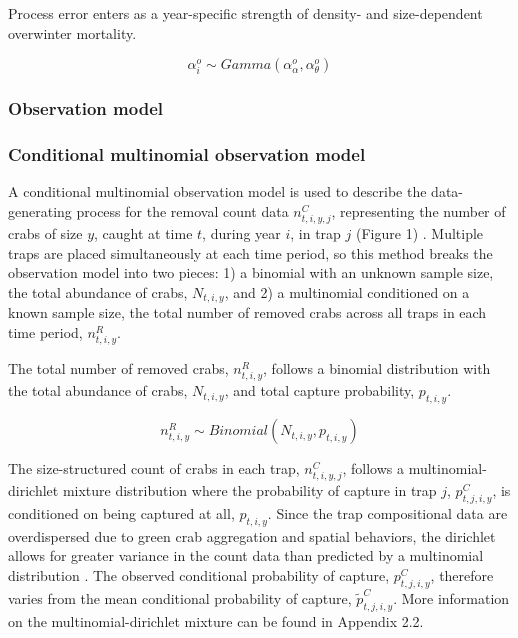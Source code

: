 \documentclass{article}
\begin{document}
Process error enters as a year-specific strength of density- and size-dependent overwinter mortality.

\begin{equation}
\alpha^o_i \sim Gamma(\alpha^o_{\alpha}, \alpha^o_{\theta})
\end{equation}

\subsubsection{Observation model}

\subsubsection*{Conditional multinomial observation model}

A conditional multinomial observation model is used to describe the data-generating process for the removal count data $n^C_{t,i,y,j}$, representing the number of crabs of size $y$, caught at time $t$, during year $i$, in trap $j$ (Figure 1) \parencite{kery2015modeling}. Multiple traps are placed simultaneously at each time period, so this method breaks the observation model into two pieces: 1) a binomial with an unknown sample size, the total abundance of crabs, $N_{t,i,y}$, and 2) a multinomial conditioned on a known sample size, the total number of removed crabs across all traps in each time period, $n^R_{t,i,y}$.

The total number of removed crabs, $n^R_{t,i,y}$, follows a binomial distribution with the total abundance of crabs, $N_{t,i,y}$, and total capture probability, $p_{t,i,y}$.

\begin{equation}
n^R_{t,i,y} \sim Binomial(N_{t,i,y}, p_{t,i,y})
\end{equation}

The size-structured count of crabs in each trap, $n^C_{t,i,y,j}$, follows a multinomial-dirichlet mixture distribution where the probability of capture in trap $j$, $p^C_{t,j,i,y}$, is conditioned on being captured at all, $p_{t,i,y}$. Since the trap compositional data are overdispersed due to green crab aggregation and spatial behaviors, the dirichlet allows for greater variance in the count data than predicted by a multinomial distribution \parencite{thorson2017model}. The observed conditional probability of capture, $p^C_{t,j,i,y}$, therefore varies from the mean conditional probability of capture, $\tilde{p}^C_{t,j,i,y}$. More information on the multinomial-dirichlet mixture can be found in Appendix 2.2.
\end{document}
